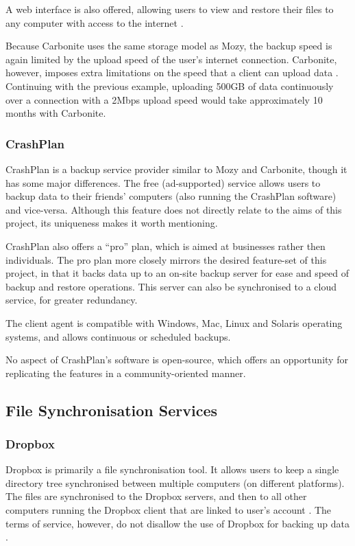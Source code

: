 A web interface is also offered, allowing users to view and restore their files
to any computer with access to the internet \cite{Carbonite}.

Because Carbonite uses the same storage model as Mozy, the backup speed is
again limited by the upload speed of the user's internet connection. Carbonite,
however, imposes extra limitations on the speed that a client can upload
data \cite{Carbonite-limits}. Continuing with the previous example, uploading
500GB of data continuously over a connection with a 2Mbps upload speed would
take approximately 10 months with Carbonite.


\subsubsection{CrashPlan}

CrashPlan is a backup service provider similar to Mozy and Carbonite, though it
has some major differences. The free (ad-supported) service allows users to
backup data to their friends' computers (also running the CrashPlan software)
and vice-versa. Although this feature does not directly relate to the aims of
this project, its uniqueness makes it worth mentioning.

CrashPlan also offers a ``pro'' plan, which is aimed at businesses rather then
individuals. The pro plan more closely mirrors the desired feature-set of this
project, in that it backs data up to an on-site backup server for ease and
speed of backup and restore operations. This server can also be synchronised to
a cloud service, for greater redundancy.

The client agent is compatible with Windows, Mac, Linux and Solaris operating
systems, and allows continuous or scheduled backups.

No aspect of CrashPlan's software is open-source, which offers an opportunity
for replicating the features in a community-oriented manner.

\subsection{File Synchronisation Services}

\subsubsection{Dropbox}

Dropbox is primarily a file synchronisation tool. It allows users to keep
a single directory tree synchronised between multiple computers (on different
platforms). The files are synchronised to the Dropbox servers, and then to all
other computers running the Dropbox client that are linked to user's
account \cite{Dropbox}.  The terms of service, however, do not disallow the use
of Dropbox for backing up data \cite{Dropbox-terms}.

